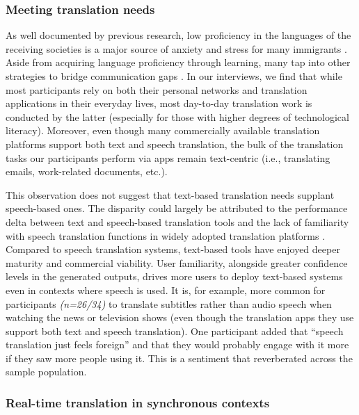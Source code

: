 \subsubsection{Meeting translation needs}

As well documented by previous research, low proficiency in the languages of the receiving societies is a major source of anxiety and stress for many immigrants \citep{ding2009stress,lueck2011acculturative,delander2005integration}. Aside from acquiring language proficiency through learning, many tap into other strategies to bridge communication gaps \citep{hutchins2009multiple,orellana2003accessing}. In our interviews, we find that while most participants rely on both their personal networks and translation applications in their everyday lives, most day-to-day translation work is conducted by the latter (especially for those with higher degrees of technological literacy). Moreover, even though many commercially available translation platforms support both text and speech translation, the bulk of the translation tasks our participants perform via apps remain text-centric (i.e., translating emails, work-related documents, etc.).

This observation does not suggest that text-based translation needs supplant speech-based ones. The disparity could largely be attributed to the performance delta between text and speech-based translation tools and the lack of familiarity with speech translation functions in widely adopted translation platforms \citep{SeamlessM4TArXiv}. Compared to speech translation systems, text-based tools have enjoyed deeper maturity and commercial viability. User familiarity, alongside greater confidence levels in the generated outputs, drives more users to deploy text-based systems even in contexts where speech is used. It is, for example, more common for participants \textit{(n=26/34)} to translate subtitles rather than audio speech when watching the news or television shows (even though the translation apps they use support both text and speech translation). One participant added that ``speech translation just feels foreign'' and that they would probably engage with it more if they saw more people using it. This is a sentiment that reverberated across the sample population.


\subsubsection{Real-time translation in synchronous contexts}


